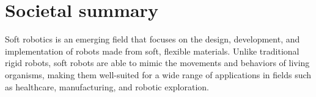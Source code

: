 \chapter*{Societal summary}






Soft robotics is an emerging field that focuses on the design, development, and implementation of robots made from soft, flexible materials. Unlike traditional rigid robots, soft robots are able to mimic the movements and behaviors of living organisms, making them well-suited for a wide range of applications in fields such as healthcare, manufacturing, and robotic exploration.

